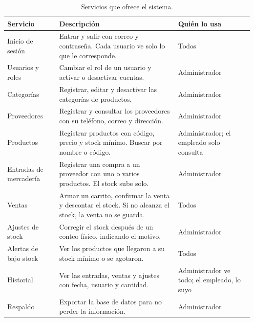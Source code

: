 \documentclass[12pt,a4paper]{article}
\begin{document}
\begin{table}[!htbp]
\centering
\footnotesize
\renewcommand{\arraystretch}{1.15}
\begin{tabularx}{\textwidth}{>{\raggedright\arraybackslash}p{3.6cm} >{\raggedright\arraybackslash}X >{\raggedright\arraybackslash}p{2.4cm}}
\toprule
\textbf{Servicio} & \textbf{Descripción} & \textbf{Quién lo usa} \\
\midrule
Inicio de sesión & Entrar y salir con correo y contraseña. Cada usuario ve solo lo que le corresponde. & Todos \\
Usuarios y roles & Cambiar el rol de un usuario y activar o desactivar cuentas. & Administrador \\
Categorías & Registrar, editar y desactivar las categorías de productos. & Administrador \\
Proveedores & Registrar y consultar los proveedores con su teléfono, correo y dirección. & Administrador \\
Productos & Registrar productos con código, precio y stock mínimo. Buscar por nombre o código. & Administrador; el empleado solo consulta \\
Entradas de mercadería & Registrar una compra a un proveedor con uno o varios productos. El stock sube solo. & Administrador \\
Ventas & Armar un carrito, confirmar la venta y descontar el stock. Si no alcanza el stock, la venta no se guarda. & Todos \\
Ajustes de stock & Corregir el stock después de un conteo físico, indicando el motivo. & Administrador \\
Alertas de bajo stock & Ver los productos que llegaron a su stock mínimo o se agotaron. & Todos \\
Historial & Ver las entradas, ventas y ajustes con fecha, usuario y cantidad. & Administrador ve todo; el empleado, lo suyo \\
Respaldo & Exportar la base de datos para no perder la información. & Administrador \\
\bottomrule
\end{tabularx}
\caption{Servicios que ofrece el sistema.}
\label{tab:funciones}
\end{table}
\end{document}
